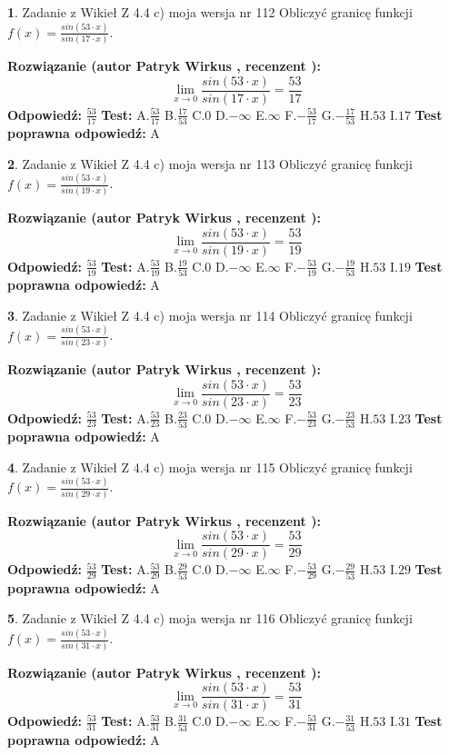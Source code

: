 \documentclass[12pt, a4paper]{article}
\theoremstyle{definition} %
\newtheorem{zad}{}
\newcommand{\zadStart}[1]{\begin{zad}#1\newline}
\newcommand{\zadStop}{\end{zad}}
\newcommand{\rozwStart}[2]{\noindent \textbf{Rozwiązanie (autor #1 , recenzent #2): }\newline}
\newcommand{\rozwStop}{\newline}
\newcommand{\odpStart}{\noindent \textbf{Odpowiedź:}\newline}
\newcommand{\odpStop}{\newline}
\newcommand{\testStart}{\noindent \textbf{Test:}\newline}
\newcommand{\testStop}{\newline}
\newcommand{\kluczStart}{\noindent \textbf{Test poprawna odpowiedź:}\newline}
\newcommand{\kluczStop}{\newline}
\begin{document}
\zadStart{Zadanie z Wikieł Z 4.4 c) moja wersja nr 112}
Obliczyć granicę funkcji $f(x)=\frac{sin(53\cdot x)}{sin(17\cdot x)}$.
\zadStop
\rozwStart{Patryk Wirkus}{}
$$\lim\limits_{x\to 0}\frac{sin(53\cdot x)}{sin(17\cdot x)}=
\frac{53}{17}$$
\rozwStop
\odpStart
$\frac{53}{17}$
\odpStop
\testStart
A.$\frac{53}{17}$
B.$\frac{17}{53}$
C.$0$
D.$-\infty$
E.$\infty$
F.$-\frac{53}{17}$
G.$-\frac{17}{53}$
H.$53$
I.$17$
\testStop
\kluczStart
A
\kluczStop



\zadStart{Zadanie z Wikieł Z 4.4 c) moja wersja nr 113}
Obliczyć granicę funkcji $f(x)=\frac{sin(53\cdot x)}{sin(19\cdot x)}$.
\zadStop
\rozwStart{Patryk Wirkus}{}
$$\lim\limits_{x\to 0}\frac{sin(53\cdot x)}{sin(19\cdot x)}=
\frac{53}{19}$$
\rozwStop
\odpStart
$\frac{53}{19}$
\odpStop
\testStart
A.$\frac{53}{19}$
B.$\frac{19}{53}$
C.$0$
D.$-\infty$
E.$\infty$
F.$-\frac{53}{19}$
G.$-\frac{19}{53}$
H.$53$
I.$19$
\testStop
\kluczStart
A
\kluczStop



\zadStart{Zadanie z Wikieł Z 4.4 c) moja wersja nr 114}
Obliczyć granicę funkcji $f(x)=\frac{sin(53\cdot x)}{sin(23\cdot x)}$.
\zadStop
\rozwStart{Patryk Wirkus}{}
$$\lim\limits_{x\to 0}\frac{sin(53\cdot x)}{sin(23\cdot x)}=
\frac{53}{23}$$
\rozwStop
\odpStart
$\frac{53}{23}$
\odpStop
\testStart
A.$\frac{53}{23}$
B.$\frac{23}{53}$
C.$0$
D.$-\infty$
E.$\infty$
F.$-\frac{53}{23}$
G.$-\frac{23}{53}$
H.$53$
I.$23$
\testStop
\kluczStart
A
\kluczStop



\zadStart{Zadanie z Wikieł Z 4.4 c) moja wersja nr 115}
Obliczyć granicę funkcji $f(x)=\frac{sin(53\cdot x)}{sin(29\cdot x)}$.
\zadStop
\rozwStart{Patryk Wirkus}{}
$$\lim\limits_{x\to 0}\frac{sin(53\cdot x)}{sin(29\cdot x)}=
\frac{53}{29}$$
\rozwStop
\odpStart
$\frac{53}{29}$
\odpStop
\testStart
A.$\frac{53}{29}$
B.$\frac{29}{53}$
C.$0$
D.$-\infty$
E.$\infty$
F.$-\frac{53}{29}$
G.$-\frac{29}{53}$
H.$53$
I.$29$
\testStop
\kluczStart
A
\kluczStop



\zadStart{Zadanie z Wikieł Z 4.4 c) moja wersja nr 116}
Obliczyć granicę funkcji $f(x)=\frac{sin(53\cdot x)}{sin(31\cdot x)}$.
\zadStop
\rozwStart{Patryk Wirkus}{}
$$\lim\limits_{x\to 0}\frac{sin(53\cdot x)}{sin(31\cdot x)}=
\frac{53}{31}$$
\rozwStop
\odpStart
$\frac{53}{31}$
\odpStop
\testStart
A.$\frac{53}{31}$
B.$\frac{31}{53}$
C.$0$
D.$-\infty$
E.$\infty$
F.$-\frac{53}{31}$
G.$-\frac{31}{53}$
H.$53$
I.$31$
\testStop
\kluczStart
A
\kluczStop
\end{document}
